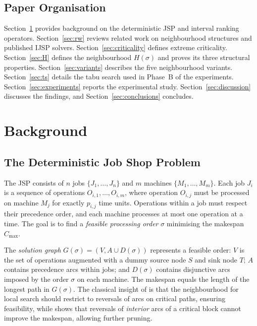 \documentclass[preprint,12pt]{elsarticle}
\begin{document}
\subsection{Paper Organisation}
\label{sec:organisation}
Section~\ref{sec:background} provides background on the deterministic JSP and interval ranking operators. Section~\ref{sec:rw} reviews related work on neighbourhood structures and published IJSP solvers. Section~\ref{sec:criticality} defines extreme criticality. Section~\ref{sec:H} defines the neighbourhood $H(\sigma)$ and proves its three structural properties. Section~\ref{sec:variants} describes the five neighbourhood variants. Section~\ref{sec:ts} details the tabu search used in Phase~B of the experiments. Section~\ref{sec:experiments} reports the experimental study. Section~\ref{sec:discussion} discusses the findings, and Section~\ref{sec:conclusions} concludes.


\section{Background}
\label{sec:background}

\subsection{The Deterministic Job Shop Problem}
\label{sec:jsp}

The JSP consists of $n$ jobs $\{J_1,\ldots,J_n\}$ and $m$ machines $\{M_1,\ldots,M_m\}$. Each job $J_i$ is a sequence of operations $O_{i,1},\ldots,O_{i,m}$, where operation $O_{i,j}$ must be processed on machine $M_j$ for exactly $p_{i,j}$ time units. Operations within a job must respect their precedence order, and each machine processes at most one operation at a time. The goal is to find a \emph{feasible processing order} $\sigma$ minimising the makespan $C_{\max}$.

The \emph{solution graph} $G(\sigma) = (V, A \cup D(\sigma))$ represents a feasible order: $V$ is the set of operations augmented with a dummy source node $S$ and sink node $T$; $A$ contains precedence arcs within jobs; and $D(\sigma)$ contains disjunctive arcs imposed by the order $\sigma$ on each machine. The makespan equals the length of the longest path in $G(\sigma)$. The classical insight of \cite{vanLaarhoven1992} is that the neighbourhood for local search should restrict to reversals of arcs on critical paths, ensuring feasibility, while \cite{Nowicki1996} shows that reversals of \emph{interior} arcs of a critical block cannot improve the makespan, allowing further pruning.
\end{document}

